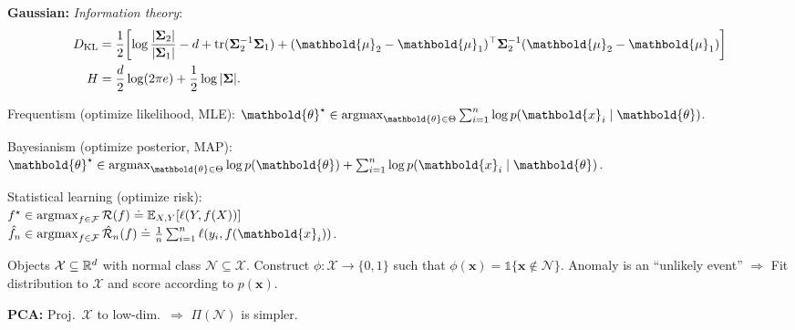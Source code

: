 \documentclass[9pt]{extarticle}
\newenvironment{topic}[1]
{\textbf{\sffamily \colorbox{black}{\rlap{\textbf{\textcolor{white}{#1}}}\hspace{\linewidth}\hspace{-2\fboxsep}}}}
{}
\newenvironment{subtopic}[1]
{\textbf{\sffamily #1:}}
{}
\renewcommand{\det}[1]{|#1|}
\renewcommand{\mat}[1]{\ensuremath{\mathbf{#1}}}
\renewcommand{\vec}[1]{\ensuremath{\mathbold{#1}}}
\begin{document}
\begin{multicols*}{3}
\begin{subtopic}{Gaussian}
        \textit{Information theory}:{\footnotesize
        \begin{align*}
            D_{\mathrm{KL}} & = \frac{1}{2} \lft[ \log \frac{\det{\mat{\Sigma}_2}}{\det{\mat{\Sigma}_1}} - d + \mathrm{tr}(\inv{\mat{\Sigma}_2} \mat{\Sigma}_1) + \transpose{(\vec{\mu}_2 - \vec{\mu}_1)} \inv{\mat{\Sigma}_2} (\vec{\mu}_2 - \vec{\mu}_1) \rgt] \\
            H               & = \frac{d}{2} \log(2\pi e) + \frac{1}{2} \log \det{\mat{\Sigma}}.
        \end{align*}}

    \end{subtopic}

    \begin{topic}{Paradigms of data science}
        Frequentism (optimize likelihood, MLE): $\vec{\theta}^\star \in \argmax_{\vec{\theta} \in \Theta} \sum_{i=1}^{n} \log p(\vec{x}_i \mid \vec{\theta})$.

        Bayesianism (optimize posterior, MAP): $\vec{\theta}^\star \in \argmax_{\vec{\theta} \in \Theta}
            \log p(\vec{\theta}) + \sum_{i=1}^{n} \log p(\vec{x}_i \mid \vec{\theta})$.

        Statistical learning (optimize risk): \\ $f^\star \in \operatorname*{argmax}_{f \in \mathcal{F}} \mathcal{R}(f)
            \doteq \mathbb{E}_{X,Y}[\ell(Y, f(X))]$ \\ $\hat{f}_n \in \argmax_{f \in \mathcal{F}}
            \hat{\mathcal{R}}_n(f) \doteq \frac{1}{n} \sum_{i=1}^{n} \ell(y_i, f(\vec{x}_i))$.
    \end{topic}

    \begin{topic}{Anomaly detection}
        Objects $\mathcal{X} \subseteq \mathbb{R}^d$ with normal class $\mathcal{N} \subseteq \mathcal{X}$.
        Construct $\phi: \mathcal{X} \to \{ 0,1 \}$ such that $\phi(\vec{x}) =
            \mathbb{1}\{\vec{x} \not\in \mathcal{N}\}$. Anomaly is an ``unlikely event'' $\Rightarrow$
        Fit distribution to $\mathcal{X}$ and score according to $p(\vec{x})$.

        \begin{subtopic}{PCA}
            Proj.\ $\mathcal{X}$ to low-dim.\ $\Rightarrow$ $\Pi(\mathcal{N})$ is simpler.


\end{subtopic}
\end{topic}
\end{multicols*}
\end{document}
